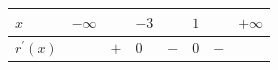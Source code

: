 \documentclass[border=.4pt]{standalone}
\begin{document}
\color{ink}\begin{tabular}{|>{\centering\arraybackslash}m{1.7cm}|>{\centering\arraybackslash}m{1.25cm}|>{\centering\arraybackslash}m{1.25cm}|>{\centering\arraybackslash}m{1.25cm}|>{\centering\arraybackslash}m{1.25cm}|>{\centering\arraybackslash}m{1.25cm}|>{\centering\arraybackslash}m{1.25cm}|>{\centering\arraybackslash}m{1.25cm}|}\hline
\cellcolor{head}$x$ & \cellcolor{head}$-\infty$ & \cellcolor{head} & \cellcolor{head}$-3$ & \cellcolor{head} & \cellcolor{head}$1$ & \cellcolor{head} & \cellcolor{head}$+\infty$ \\ \hline
\cellcolor{head}$r^{\prime}(x)$ &  & $+$ & $0$ & $-$ & $0$ & $-$ &  \\ \hline\end{tabular}
\end{document}
